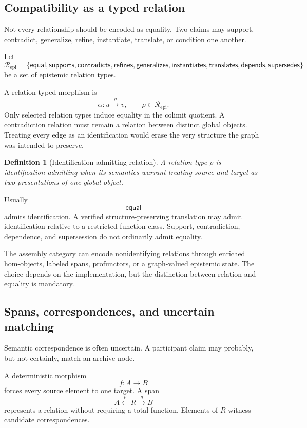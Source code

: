\documentclass[11pt]{article}
\newtheorem{definition}{Definition}[section]
\theoremstyle{definition}
\begin{document}
\subsection{Compatibility as a typed relation}

Not every relationship should be encoded as equality. Two claims may support, contradict, generalize, refine, instantiate, translate, or condition one another.

Let
\[
\mathcal R_{\mathrm{epi}}
=
\{
\mathsf{equal},
\mathsf{supports},
\mathsf{contradicts},
\mathsf{refines},
\mathsf{generalizes},
\mathsf{instantiates},
\mathsf{translates},
\mathsf{depends},
\mathsf{supersedes}
\}
\]
be a set of epistemic relation types.

A relation-typed morphism is
\[
\alpha:u\xrightarrow{\rho}v,
\qquad
\rho\in\mathcal R_{\mathrm{epi}}.
\]
Only selected relation types induce equality in the colimit quotient. A contradiction relation must remain a relation between distinct global objects. Treating every edge as an identification would erase the very structure the graph was intended to preserve.

\begin{definition}[Identification-admitting relation]
A relation type \(\rho\) is identification admitting when its semantics warrant treating source and target as two presentations of one global object.
\end{definition}

Usually
\[
\mathsf{equal}
\]
admits identification. A verified structure-preserving translation may admit identification relative to a restricted function class. Support, contradiction, dependence, and supersession do not ordinarily admit equality.

The assembly category can encode nonidentifying relations through enriched hom-objects, labeled spans, profunctors, or a graph-valued epistemic state. The choice depends on the implementation, but the distinction between relation and equality is mandatory.

\subsection{Spans, correspondences, and uncertain matching}

Semantic correspondence is often uncertain. A participant claim may probably, but not certainly, match an archive node.

A deterministic morphism
\[
f:A\to B
\]
forces every source element to one target. A span
\[
A\xleftarrow{p}R\xrightarrow{q}B
\]
represents a relation without requiring a total function. Elements of \(R\) witness candidate correspondences.
\end{document}
